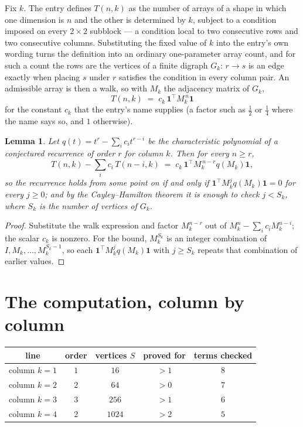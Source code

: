 \documentclass[11pt,a4paper]{article}
\theoremstyle{plain}
\newtheorem{lemma}[theorem]{Lemma}
\theoremstyle{definition}
\begin{document}
Fix $k$. The entry defines $T(n,k)$ as the number of arrays of a shape in which one dimension
is $n$ and the other is determined by $k$, subject to a condition imposed on every
$2\times2$ subblock --- a condition local to two consecutive rows and two consecutive columns.
Substituting the fixed value of $k$ into the entry's own wording turns the definition into an
ordinary one-parameter array count, and for such a count the rows are the vertices of a finite
digraph $G_k$: $r\to s$ is an edge exactly when placing $s$ under $r$ satisfies the condition
in every column pair. An admissible array is then a walk, so with $M_k$ the adjacency matrix
of $G_k$,
\[
T(n,k)\;=\;c_k\,\mathbf{1}^{\!\top}M_k^{\,n}\mathbf{1}
\]
for the constant $c_k$ that the entry's name supplies (a factor such as $\tfrac12$ or
$\tfrac14$ where the name says so, and $1$ otherwise).

\begin{lemma}\label{lem:crit}
Let $q(t)=t^{r}-\sum_i c_it^{r-i}$ be the characteristic polynomial of a conjectured
recurrence of order $r$ for column $k$. Then for every $n\ge r$,
\[
T(n,k)-\sum_i c_i\,T(n-i,k)\;=\;c_k\,\mathbf{1}^{\!\top}M_k^{\,n-r}q(M_k)\mathbf{1},
\]
so the recurrence holds from some point on if and only if
$\mathbf{1}^{\!\top}M_k^{j}q(M_k)\mathbf{1}=0$ for every $j\ge0$; and by the
Cayley--Hamilton theorem it is enough to check $j<S_k$, where $S_k$ is the number of vertices
of $G_k$.
\end{lemma}

\begin{proof}
Substitute the walk expression and factor $M_k^{n-r}$ out of $M_k^{n}-\sum_ic_iM_k^{n-i}$;
the scalar $c_k$ is nonzero. For the bound, $M_k^{S_k}$ is an integer combination of
$I,M_k,\dots,M_k^{S_k-1}$, so each $\mathbf{1}^{\!\top}M_k^{j}q(M_k)\mathbf{1}$ with
$j\ge S_k$ repeats that combination of earlier values.
\end{proof}

\section{The computation, column by column}

\begin{center}
\begin{tabular}{ccccc}
line & order & vertices $S$ & proved for & terms checked \\ \hline
column $k$$=1$ & $1$ & $16$ & $>1$ & $8$ \\
column $k$$=2$ & $2$ & $64$ & $>0$ & $7$ \\
column $k$$=3$ & $3$ & $256$ & $>1$ & $6$ \\
column $k$$=4$ & $2$ & $1024$ & $>2$ & $5$ \\
\end{tabular}
\end{center}
\end{document}
